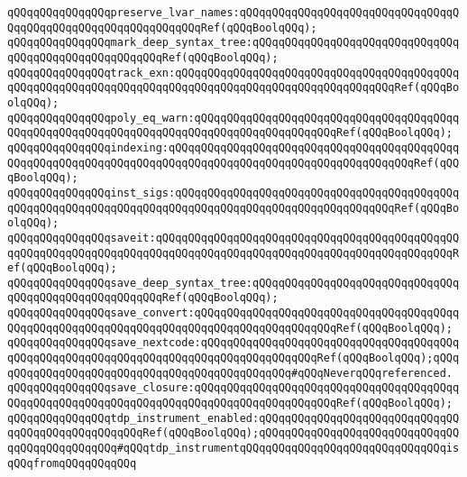\verb|qQQqqQQqqQQqqQQqpreserve_lvar_names:qQQqqQQqqQQqqQQqqQQqqQQqqQQqqQQqqQQqqQQqqQQqqQQqqQQqqQQqqQQqqQQqRef(qQQqBoolqQQq);|\newline
\verb|qQQqqQQqqQQqqQQqmark_deep_syntax_tree:qQQqqQQqqQQqqQQqqQQqqQQqqQQqqQQqqQQqqQQqqQQqqQQqqQQqqQQqRef(qQQqBoolqQQq);|\newline
\verb|qQQqqQQqqQQqqQQqtrack_exn:qQQqqQQqqQQqqQQqqQQqqQQqqQQqqQQqqQQqqQQqqQQqqQQqqQQqqQQqqQQqqQQqqQQqqQQqqQQqqQQqqQQqqQQqqQQqqQQqqQQqqQQqRef(qQQqBoolqQQq);|\newline
\verb|qQQqqQQqqQQqqQQqpoly_eq_warn:qQQqqQQqqQQqqQQqqQQqqQQqqQQqqQQqqQQqqQQqqQQqqQQqqQQqqQQqqQQqqQQqqQQqqQQqqQQqqQQqqQQqqQQqqQQqRef(qQQqBoolqQQq);|\newline
\verb|qQQqqQQqqQQqqQQqindexing:qQQqqQQqqQQqqQQqqQQqqQQqqQQqqQQqqQQqqQQqqQQqqQQqqQQqqQQqqQQqqQQqqQQqqQQqqQQqqQQqqQQqqQQqqQQqqQQqqQQqqQQqqQQqRef(qQQqBoolqQQq);|\newline
\verb|qQQqqQQqqQQqqQQqinst_sigs:qQQqqQQqqQQqqQQqqQQqqQQqqQQqqQQqqQQqqQQqqQQqqQQqqQQqqQQqqQQqqQQqqQQqqQQqqQQqqQQqqQQqqQQqqQQqqQQqqQQqqQQqRef(qQQqBoolqQQq);|\newline
\newline
\verb|qQQqqQQqqQQqqQQqsaveit:qQQqqQQqqQQqqQQqqQQqqQQqqQQqqQQqqQQqqQQqqQQqqQQqqQQqqQQqqQQqqQQqqQQqqQQqqQQqqQQqqQQqqQQqqQQqqQQqqQQqqQQqqQQqqQQqqQQqRef(qQQqBoolqQQq);|\newline
\verb|qQQqqQQqqQQqqQQqsave_deep_syntax_tree:qQQqqQQqqQQqqQQqqQQqqQQqqQQqqQQqqQQqqQQqqQQqqQQqqQQqqQQqRef(qQQqBoolqQQq);|\newline
\verb|qQQqqQQqqQQqqQQqsave_convert:qQQqqQQqqQQqqQQqqQQqqQQqqQQqqQQqqQQqqQQqqQQqqQQqqQQqqQQqqQQqqQQqqQQqqQQqqQQqqQQqqQQqqQQqqQQqRef(qQQqBoolqQQq);|\newline
\verb|qQQqqQQqqQQqqQQqsave_nextcode:qQQqqQQqqQQqqQQqqQQqqQQqqQQqqQQqqQQqqQQqqQQqqQQqqQQqqQQqqQQqqQQqqQQqqQQqqQQqqQQqqQQqqQQqRef(qQQqBoolqQQq);qQQqqQQqqQQqqQQqqQQqqQQqqQQqqQQqqQQqqQQqqQQqqQQq#qQQqNeverqQQqreferenced.|\newline
\verb|qQQqqQQqqQQqqQQqsave_closure:qQQqqQQqqQQqqQQqqQQqqQQqqQQqqQQqqQQqqQQqqQQqqQQqqQQqqQQqqQQqqQQqqQQqqQQqqQQqqQQqqQQqqQQqqQQqRef(qQQqBoolqQQq);|\newline
\newline
\verb|qQQqqQQqqQQqqQQqtdp_instrument_enabled:qQQqqQQqqQQqqQQqqQQqqQQqqQQqqQQqqQQqqQQqqQQqqQQqqQQqRef(qQQqBoolqQQq);qQQqqQQqqQQqqQQqqQQqqQQqqQQqqQQqqQQqqQQqqQQqqQQq#qQQqtdp_instrumentqQQqqQQqqQQqqQQqqQQqqQQqqQQqqQQqisqQQqfromqQQqqQQqqQQq|\newline
